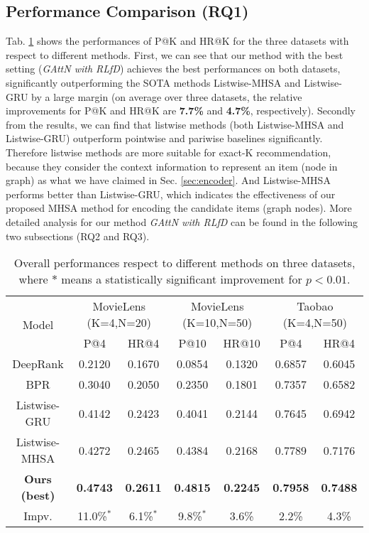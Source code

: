 \subsection{Performance Comparison (RQ1)}
Tab. \ref{tab:main_result} shows the performances of P@K and HR@K for the three datasets with respect to different methods.
First, we can see that our method with the best setting (\emph{GAttN with RLfD}) achieves the best performances
on both datasets, significantly outperforming the SOTA
methods Listwise-MHSA and Listwise-GRU by a large margin
(on average over three datasets,
the relative improvements for P@K and HR@K are
\textbf{7.7\%} and \textbf{4.7\%}, respectively).
Secondly from the results, 
we can find that listwise methods (both Listwise-MHSA and Listwise-GRU)
outperform pointwise and pariwise baselines significantly.
Therefore listwise methods are more suitable for exact-K recommendation,
because they consider the context information to represent an item (node in graph) as what we have claimed in Sec. \ref{sec:encoder}.
And Listwise-MHSA performs better than Listwise-GRU,
which indicates the effectiveness of our proposed MHSA method for encoding the candidate items (graph nodes).
More detailed analysis for our method \emph{GAttN with RLfD} can be found in the following two subsections (RQ2 and RQ3).
\begin{table}[h]
	\caption{Overall performances respect to different methods on three datasets, where $*$ means a statistically significant improvement for $p<0.01$.}
	\centering
	\scriptsize
	\begin{tabular}{c|c|c|c|c|c|c}
		\toprule
		\multirow{2}{*}{Model} & \multicolumn{2}{c|}{MovieLens (K=4,N=20)} & \multicolumn{2}{c|}{MovieLens (K=10,N=50)} & \multicolumn{2}{c}{Taobao (K=4,N=50)} \\
		\cmidrule{2-7}
		 & P@4 & HR@4 & P@10 & HR@10 & P@4 & HR@4 \\
		 \cmidrule{1-7}
		 DeepRank & 0.2120 & 0.1670 & 0.0854 & 0.1320 & 0.6857 & 0.6045 \\
		 BPR &  0.3040 & 0.2050 & 0.2350 & 0.1801 & 0.7357 & 0.6582 \\
		 Listwise-GRU & 0.4142 & 0.2423 & 0.4041 & 0.2144 & 0.7645 & 0.6942 \\
		 Listwise-MHSA & 0.4272 & 0.2465 & 0.4384 & 0.2168 & 0.7789 & 0.7176 \\
		 \textbf{Ours (best)} & \textbf{0.4743} & \textbf{0.2611} & \textbf{0.4815} & \textbf{0.2245} & \textbf{0.7958} & \textbf{0.7488} \\
		 \cmidrule{1-7}
		 Impv. & 11.0\%$^*$ & 6.1\%$^*$ & 9.8\%$^*$ & 3.6\% & 2.2\% & 4.3\% \\
		\bottomrule
	\end{tabular}
	\label{tab:main_result}
\end{table}


